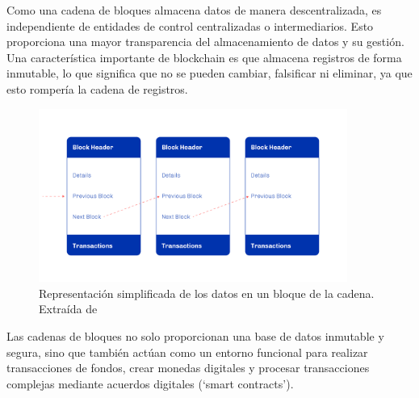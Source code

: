 \documentclass[12pt]{book}
\begin{document}
Como una cadena de bloques almacena datos de manera descentralizada, es independiente de entidades de control centralizadas o intermediarios. Esto proporciona una mayor transparencia del almacenamiento de datos y su gestión. Una característica importante de blockchain es que almacena registros de forma inmutable, lo que significa que no se pueden cambiar, falsificar ni eliminar, ya que esto rompería la cadena de registros.

\begin{figure}
	\centering
	\includegraphics[width=0.9\textwidth]{Bloques.png}
	\caption{Representación simplificada de los datos en un bloque de la cadena. Extraída de~\cite{plutus-smart-contracts}}\label{fig:Bloques}
\end{figure}

Las cadenas de bloques no solo proporcionan una base de datos inmutable y segura, sino que también actúan como un entorno funcional para realizar transacciones de fondos, crear monedas digitales y procesar transacciones complejas mediante acuerdos digitales (`smart contracts').


\end{document}
